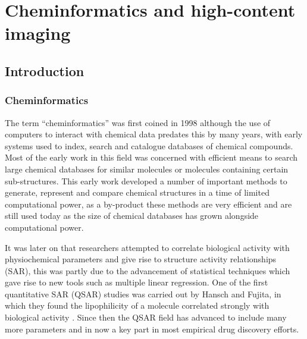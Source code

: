 \documentclass[a4paper,11pt,twoside,openright]{scrbook}
\begin{document}
\chapter{Cheminformatics and high-content imaging} \label{chapter:cheminformatics}

\section{Introduction}

\subsection{Cheminformatics}
The term ``cheminformatics'' was first coined in 1998\cite{Brown1998} although the use of computers to interact with chemical data predates this by many years, with early systems used to index, search and catalogue databases of chemical compounds. \cite{Ray1957}
Most of the early work in this field was concerned with efficient means to search large chemical databases for similar molecules or molecules containing certain sub-structures.
This early work developed a number of important methods to generate, represent and compare chemical structures in a time of limited computational power, as a by-product these methods are very efficient and are still used today as the size of chemical databases has grown alongside computational power.

It was later on that researchers attempted to correlate biological activity with physiochemical parameters and give rise to structure activity relationships (SAR), this was partly due to the advancement of statistical techniques which gave rise to new tools such as multiple linear regression.
One of the first quantitative SAR (QSAR) studies was carried out by Hansch and Fujita, in which they found the lipophilicity of a molecule correlated strongly with biological activity \cite{HanschCitation}.
Since then the QSAR field has advanced to include many more parameters and in now a key part in most empirical drug discovery efforts.
\end{document}

